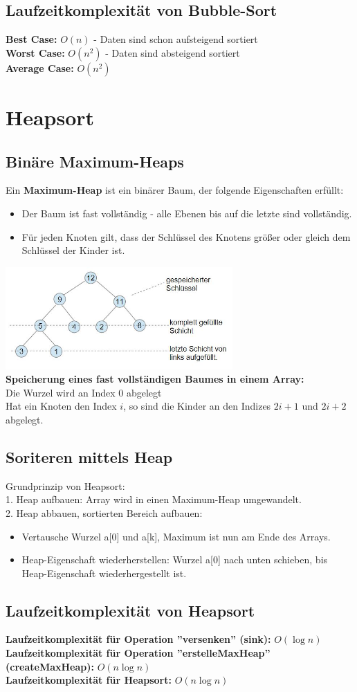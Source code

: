 \documentclass{scrreprt}
\begin{document}
\subsection{Laufzeitkomplexität von Bubble-Sort}
\textbf{Best Case:} $O(n)$ - Daten sind schon aufsteigend sortiert
\\\textbf{Worst Case:} $O(n^2)$ - Daten sind absteigend sortiert
\\\textbf{Average Case:} $O(n^2)$
\section{Heapsort}
\subsection{Binäre Maximum-Heaps}
Ein \textbf{Maximum-Heap} ist ein binärer Baum, der folgende Eigenschaften erfüllt:
\begin{itemize}
  \item Der Baum ist fast vollständig - alle Ebenen bis auf die letzte sind vollständig.
  \item Für jeden Knoten gilt, dass der Schlüssel des Knotens größer oder gleich dem Schlüssel der Kinder ist.
\end{itemize}
\includegraphics[width=0.65\textwidth]{graphics/maximum-heap.jpg}
\\\textbf{Speicherung eines fast vollständigen Baumes in einem Array:}
\\Die Wurzel wird an Index 0 abgelegt
\\Hat ein Knoten den Index $i$, so sind die Kinder an den Indizes $2i+1$ und $2i+2$ abgelegt.
\subsection{Soriteren mittels Heap}
Grundprinzip von Heapsort:
\\1. Heap aufbauen: Array wird in einen Maximum-Heap umgewandelt.
\\2. Heap abbauen, sortierten Bereich aufbauen:
\begin{itemize}
  \item Vertausche Wurzel a[0] und a[k], Maximum ist nun am Ende des Arrays.
  \item Heap-Eigenschaft wiederherstellen: Wurzel a[0] nach unten schieben, bis Heap-Eigenschaft 
  wiederhergestellt ist.
\end{itemize}
\subsection{Laufzeitkomplexität von Heapsort}
\textbf{Laufzeitkomplexität für Operation ''versenken'' (sink):} $O(\log n)$
\\\textbf{Laufzeitkomplexität für Operation ''erstelleMaxHeap'' (createMaxHeap):} $O(n \log n)$
\\\textbf{Laufzeitkomplexität für Heapsort:} $O(n \log n)$
\end{document}
